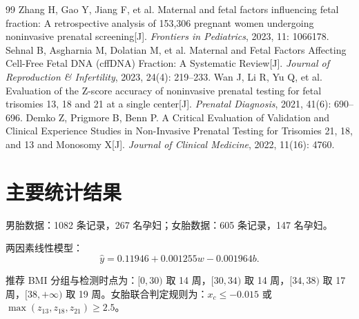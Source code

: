 ﻿\documentclass[12pt,a4paper]{article}
\begin{document}
\begin{thebibliography}{99}
 Zhang H, Gao Y, Jiang F, et al. Maternal and fetal factors influencing fetal fraction: A retrospective analysis of 153,306 pregnant women undergoing noninvasive prenatal screening[J]. \textit{Frontiers in Pediatrics}, 2023, 11: 1066178.
 Sehnal B, Asgharnia M, Dolatian M, et al. Maternal and Fetal Factors Affecting Cell-Free Fetal DNA (cffDNA) Fraction: A Systematic Review[J]. \textit{Journal of Reproduction \& Infertility}, 2023, 24(4): 219--233.
 Wan J, Li R, Yu Q, et al. Evaluation of the Z-score accuracy of noninvasive prenatal testing for fetal trisomies 13, 18 and 21 at a single center[J]. \textit{Prenatal Diagnosis}, 2021, 41(6): 690--696.
 Demko Z, Prigmore B, Benn P. A Critical Evaluation of Validation and Clinical Experience Studies in Non-Invasive Prenatal Testing for Trisomies 21, 18, and 13 and Monosomy X[J]. \textit{Journal of Clinical Medicine}, 2022, 11(16): 4760.
\end{thebibliography}

\appendix
\section{主要统计结果}
男胎数据：1082 条记录，267 名孕妇；女胎数据：605 条记录，147 名孕妇。

两因素线性模型：
\[
\hat y = 0.11946 + 0.001255w - 0.001964b.
\]

推荐 BMI 分组与检测时点为：$[0,30)$ 取 14 周，$[30,34)$ 取 14 周，$[34,38)$ 取 17 周，$[38,+\infty)$ 取 19 周。女胎联合判定规则为：$x_c\le -0.015$ 或 $\max(z_{13},z_{18},z_{21})\ge 2.5$。
\end{document}
